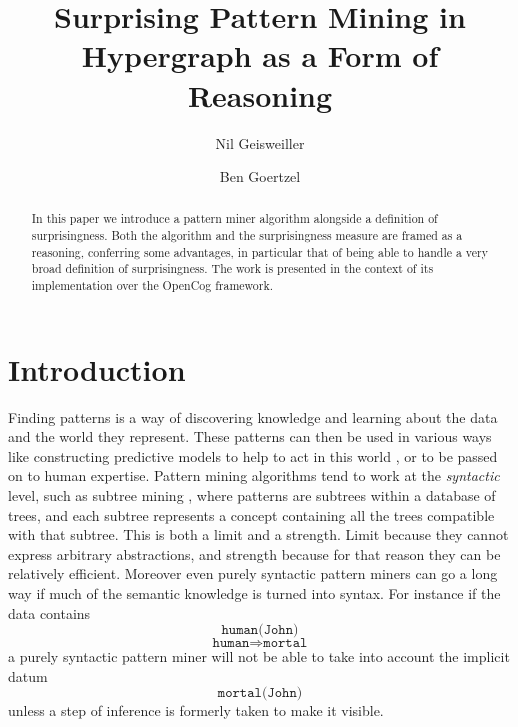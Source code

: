 \documentclass[runningheads]{llncs}
\begin{document}
%
\title{Surprising Pattern Mining in Hypergraph as a Form of Reasoning}
%
%
\author{Nil Geisweiller
  \and Ben Goertzel}
%
%
%
\maketitle              %
%

\begin{abstract}
  In this paper we introduce a pattern miner algorithm alongside a
  definition of surprisingness. Both the algorithm and the
  surprisingness measure are framed as a reasoning, conferring some
  advantages, in particular that of being able to handle a very broad
  definition of surprisingness. The work is presented in the context
  of its implementation over the OpenCog framework.

\end{abstract}

\section{Introduction}

Finding patterns is a way of discovering knowledge and learning about
the data and the world they represent. These patterns can then be used
in various ways like constructing predictive models to help to act in
this world \cite{Jade12Pat}, or to be passed on to human
expertise. Pattern mining algorithms tend to work at the
\emph{syntactic} level, such as subtree mining \cite{Chi2005Freq},
where patterns are subtrees within a database of trees, and each
subtree represents a concept containing all the trees compatible with
that subtree. This is both a limit and a strength. Limit because they
cannot express arbitrary abstractions, and strength because for that
reason they can be relatively efficient. Moreover even purely
syntactic pattern miners can go a long way if much of the semantic
knowledge is turned into syntax. For instance if the data contains
$$\texttt{human(John)}$$
$$\texttt{human}\Rightarrow\texttt{mortal}$$ a purely syntactic
pattern miner will not be able to take into account the implicit
datum $$\texttt{mortal(John)}$$ unless a step of inference is formerly
taken to make it visible.
\end{document}
